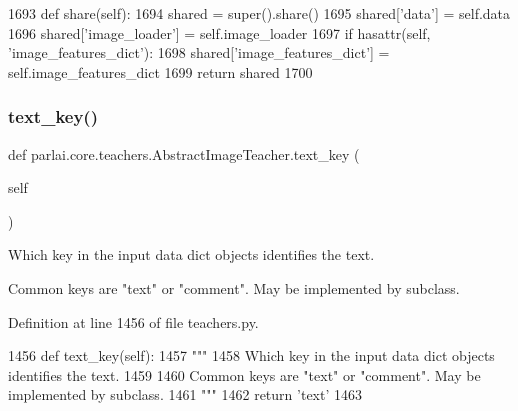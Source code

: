 \begin{DoxyCode}
1693     \textcolor{keyword}{def }share(self):
1694         shared = super().share()
1695         shared[\textcolor{stringliteral}{'data'}] = self.data
1696         shared[\textcolor{stringliteral}{'image\_loader'}] = self.image\_loader
1697         \textcolor{keywordflow}{if} hasattr(self, \textcolor{stringliteral}{'image\_features\_dict'}):
1698             shared[\textcolor{stringliteral}{'image\_features\_dict'}] = self.image\_features\_dict
1699         \textcolor{keywordflow}{return} shared
1700 \end{DoxyCode}
\mbox{\label{classparlai_1_1core_1_1teachers_1_1AbstractImageTeacher_a95e578f9650f77c1d397319b9050af51}} 
\subsubsection{\texorpdfstring{text\+\_\+key()}{text\_key()}}
{\footnotesize\ttfamily def parlai.\+core.\+teachers.\+Abstract\+Image\+Teacher.\+text\+\_\+key (\begin{DoxyParamCaption}\item[{}]{self }\end{DoxyParamCaption})}

\begin{DoxyVerb}Which key in the input data dict objects identifies the text.

Common keys are "text" or "comment". May be implemented by subclass.
\end{DoxyVerb}
 

Definition at line 1456 of file teachers.\+py.


\begin{DoxyCode}
1456     \textcolor{keyword}{def }text\_key(self):
1457         \textcolor{stringliteral}{"""}
1458 \textcolor{stringliteral}{        Which key in the input data dict objects identifies the text.}
1459 \textcolor{stringliteral}{}
1460 \textcolor{stringliteral}{        Common keys are "text" or "comment". May be implemented by subclass.}
1461 \textcolor{stringliteral}{        """}
1462         \textcolor{keywordflow}{return} \textcolor{stringliteral}{'text'}
1463 
\end{DoxyCode}


